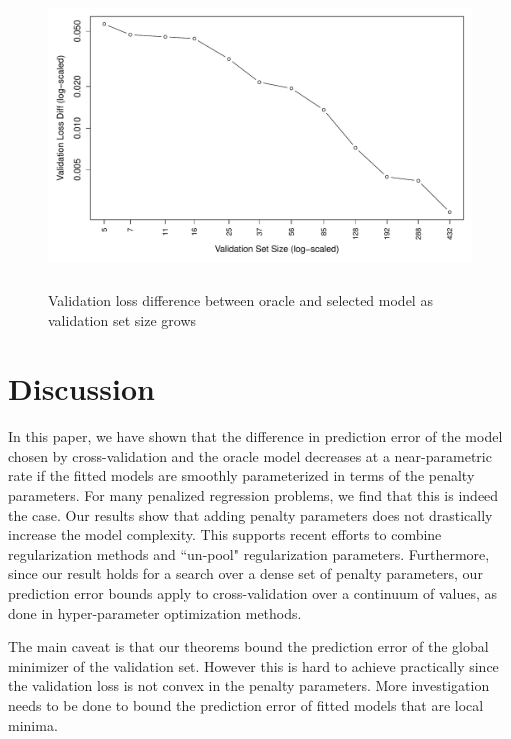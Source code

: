 \documentclass[12pt]{article}
\begin{document}
\begin{figure}
\label{fig:emp_v_theory}
\caption{
	Validation loss difference between oracle and selected model as validation set size grows
}
\centering
\includegraphics[height=80mm]{../R/figures/validation_size_loss_diff.pdf}
\end{figure}

\section{Discussion}\label{sec:discussion}

In this paper, we have shown that the difference in prediction error of the model chosen by cross-validation and the oracle model decreases at a near-parametric rate if the fitted models are smoothly parameterized in terms of the penalty parameters. For many penalized regression problems, we find that this is indeed the case. Our results show that adding penalty parameters does not drastically increase the model complexity. This supports recent efforts to combine regularization methods and ``un-pool" regularization parameters. Furthermore, since our result holds for a search over a dense set of penalty parameters, our prediction error bounds apply to cross-validation over a continuum of values, as done in hyper-parameter optimization methods.

The main caveat is that our theorems bound the prediction error of the global minimizer of the validation set. However this is hard to achieve practically since the validation loss is not convex in the penalty parameters. More investigation needs to be done to bound the prediction error of fitted models that are local minima.
\end{document}
